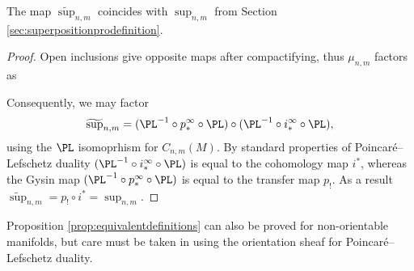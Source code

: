 \begin{proposition}\label{prop:equivalentdefinitions}
    The map $\widetilde{\sup}_{n,m}$ coincides with $\sup_{n,m}$ from Section \ref{sec:superpositionprodefinition}.
\end{proposition}
\begin{proof}
    Open inclusions give opposite maps after compactifying, thus $\mu_{n,m}$ factors as
\begin{center}
\end{center}
Consequently, we may factor $$\widetilde{\sup}_{n,m}=(\PL^{-1}\circ p^{\infty}_* \circ \PL)\circ(\PL^{-1}\circ i^{\infty}_* \circ \PL),$$
using the $\PL$ isomoprhism for $C_{n,m}(M)$. By standard properties of Poincar\'e--Lefschetz duality $(\PL^{-1}\circ i^{\infty}_* \circ \PL)$ is equal to the cohomology map $i^*$, whereas the Gysin map $(\PL^{-1}\circ p^{\infty}_* \circ \PL)$ is equal to the transfer map $p_!$. As a result $\widetilde{\sup}_{n,m}=p_!\circ i^*=\sup_{n,m}$.
\end{proof}
    Proposition \ref{prop:equivalentdefinitions} can also be proved for non-orientable manifolds, but care must be taken in using the orientation sheaf for Poincar\'e--Lefschetz duality.






